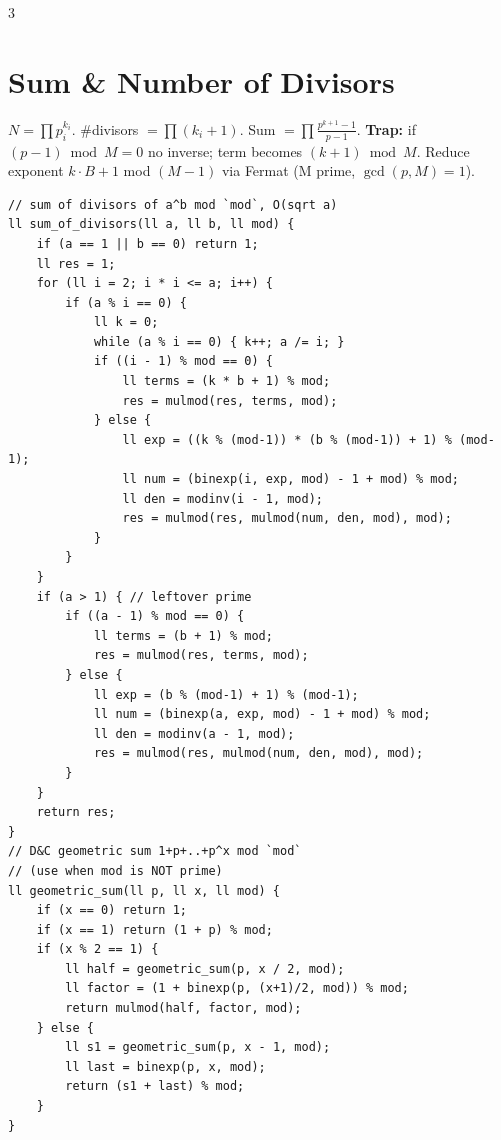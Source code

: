 \documentclass[10pt]{article}
\newcommand{\note}[1]{{\scriptsize #1}\par}
\begin{document}
\begin{multicols*}{3}
\section{Sum \& Number of Divisors}
\note{$N=\prod p_i^{k_i}$. \#divisors $=\prod(k_i+1)$. Sum $=\prod \frac{p^{k+1}-1}{p-1}$. \textbf{Trap:} if $(p-1)\bmod M=0$ no inverse; term becomes $(k+1)\bmod M$. Reduce exponent $k\cdot B+1$ mod $(M-1)$ via Fermat (M prime, $\gcd(p,M)=1$).}
\begin{lstlisting}
// sum of divisors of a^b mod `mod`, O(sqrt a)
ll sum_of_divisors(ll a, ll b, ll mod) {
    if (a == 1 || b == 0) return 1;
    ll res = 1;
    for (ll i = 2; i * i <= a; i++) {
        if (a % i == 0) {
            ll k = 0;
            while (a % i == 0) { k++; a /= i; }
            if ((i - 1) % mod == 0) {
                ll terms = (k * b + 1) % mod;
                res = mulmod(res, terms, mod);
            } else {
                ll exp = ((k % (mod-1)) * (b % (mod-1)) + 1) % (mod-1);
                ll num = (binexp(i, exp, mod) - 1 + mod) % mod;
                ll den = modinv(i - 1, mod);
                res = mulmod(res, mulmod(num, den, mod), mod);
            }
        }
    }
    if (a > 1) { // leftover prime
        if ((a - 1) % mod == 0) {
            ll terms = (b + 1) % mod;
            res = mulmod(res, terms, mod);
        } else {
            ll exp = (b % (mod-1) + 1) % (mod-1);
            ll num = (binexp(a, exp, mod) - 1 + mod) % mod;
            ll den = modinv(a - 1, mod);
            res = mulmod(res, mulmod(num, den, mod), mod);
        }
    }
    return res;
}
// D&C geometric sum 1+p+..+p^x mod `mod`
// (use when mod is NOT prime)
ll geometric_sum(ll p, ll x, ll mod) {
    if (x == 0) return 1;
    if (x == 1) return (1 + p) % mod;
    if (x % 2 == 1) {
        ll half = geometric_sum(p, x / 2, mod);
        ll factor = (1 + binexp(p, (x+1)/2, mod)) % mod;
        return mulmod(half, factor, mod);
    } else {
        ll s1 = geometric_sum(p, x - 1, mod);
        ll last = binexp(p, x, mod);
        return (s1 + last) % mod;
    }
}
\end{lstlisting}


\end{multicols*}
\end{document}
